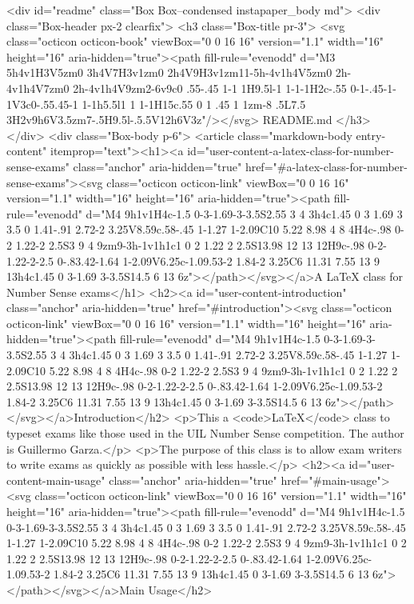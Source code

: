   <div id="readme" class="Box Box--condensed instapaper_body md">
    <div class="Box-header px-2 clearfix">
      <h3 class="Box-title pr-3">
        <svg class="octicon octicon-book" viewBox="0 0 16 16" version="1.1" width="16" height="16" aria-hidden="true"><path fill-rule="evenodd" d="M3 5h4v1H3V5zm0 3h4V7H3v1zm0 2h4V9H3v1zm11-5h-4v1h4V5zm0 2h-4v1h4V7zm0 2h-4v1h4V9zm2-6v9c0 .55-.45 1-1 1H9.5l-1 1-1-1H2c-.55 0-1-.45-1-1V3c0-.55.45-1 1-1h5.5l1 1 1-1H15c.55 0 1 .45 1 1zm-8 .5L7.5 3H2v9h6V3.5zm7-.5H9.5l-.5.5V12h6V3z"/></svg>
        README.md
      </h3>
    </div>
      <div class="Box-body p-6">
        <article class="markdown-body entry-content" itemprop="text"><h1><a id="user-content-a-latex-class-for-number-sense-exams" class="anchor" aria-hidden="true" href="#a-latex-class-for-number-sense-exams"><svg class="octicon octicon-link" viewBox="0 0 16 16" version="1.1" width="16" height="16" aria-hidden="true"><path fill-rule="evenodd" d="M4 9h1v1H4c-1.5 0-3-1.69-3-3.5S2.55 3 4 3h4c1.45 0 3 1.69 3 3.5 0 1.41-.91 2.72-2 3.25V8.59c.58-.45 1-1.27 1-2.09C10 5.22 8.98 4 8 4H4c-.98 0-2 1.22-2 2.5S3 9 4 9zm9-3h-1v1h1c1 0 2 1.22 2 2.5S13.98 12 13 12H9c-.98 0-2-1.22-2-2.5 0-.83.42-1.64 1-2.09V6.25c-1.09.53-2 1.84-2 3.25C6 11.31 7.55 13 9 13h4c1.45 0 3-1.69 3-3.5S14.5 6 13 6z"></path></svg></a>A LaTeX class for Number Sense exams</h1>
<h2><a id="user-content-introduction" class="anchor" aria-hidden="true" href="#introduction"><svg class="octicon octicon-link" viewBox="0 0 16 16" version="1.1" width="16" height="16" aria-hidden="true"><path fill-rule="evenodd" d="M4 9h1v1H4c-1.5 0-3-1.69-3-3.5S2.55 3 4 3h4c1.45 0 3 1.69 3 3.5 0 1.41-.91 2.72-2 3.25V8.59c.58-.45 1-1.27 1-2.09C10 5.22 8.98 4 8 4H4c-.98 0-2 1.22-2 2.5S3 9 4 9zm9-3h-1v1h1c1 0 2 1.22 2 2.5S13.98 12 13 12H9c-.98 0-2-1.22-2-2.5 0-.83.42-1.64 1-2.09V6.25c-1.09.53-2 1.84-2 3.25C6 11.31 7.55 13 9 13h4c1.45 0 3-1.69 3-3.5S14.5 6 13 6z"></path></svg></a>Introduction</h2>
<p>This a <code>\LaTeX</code> class to typeset exams like those used in the UIL Number Sense
competition. The author is Guillermo Garza.</p>
<p>The purpose of this class is to allow exam writers to write exams as quickly as
possible with less hassle.</p>
<h2><a id="user-content-main-usage" class="anchor" aria-hidden="true" href="#main-usage"><svg class="octicon octicon-link" viewBox="0 0 16 16" version="1.1" width="16" height="16" aria-hidden="true"><path fill-rule="evenodd" d="M4 9h1v1H4c-1.5 0-3-1.69-3-3.5S2.55 3 4 3h4c1.45 0 3 1.69 3 3.5 0 1.41-.91 2.72-2 3.25V8.59c.58-.45 1-1.27 1-2.09C10 5.22 8.98 4 8 4H4c-.98 0-2 1.22-2 2.5S3 9 4 9zm9-3h-1v1h1c1 0 2 1.22 2 2.5S13.98 12 13 12H9c-.98 0-2-1.22-2-2.5 0-.83.42-1.64 1-2.09V6.25c-1.09.53-2 1.84-2 3.25C6 11.31 7.55 13 9 13h4c1.45 0 3-1.69 3-3.5S14.5 6 13 6z"></path></svg></a>Main Usage</h2>
